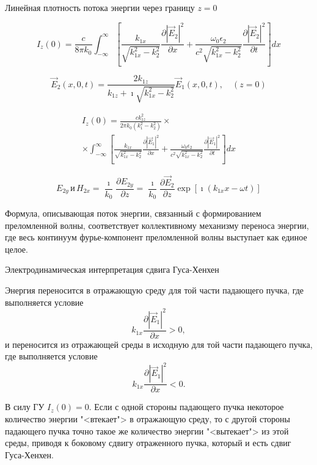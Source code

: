 \documentclass[9pt, compress, xcolor=table]{beamer}
\begin{document}
\begin{frame}{Линейная плотность потока энергии через границу $z=0$}

\begin{equation*}
I_z(0) = \frac{c}{8\pi k_0} \int_{-\infty}^{\infty} \left[ \frac{k_{1x}}{\sqrt{k_{1x}^2-k_2^2}} \frac{\partial |{\vec E}_2|^2}{\partial x} + \frac{\omega_0 \epsilon_2}{c^2 \sqrt{k_{1x}^2-k_2^2}} \frac{\partial |{\vec E}_2|^2}{\partial t}  \right] dx
\end{equation*}

\begin{equation*}
{\vec E}_2(x,0,t) = \frac{2k_{1z}}{k_{1z} + \imath \sqrt{k_{1x}^2-k_2^2}} {\vec E}_1(x,0,t), \quad (z=0)
\end{equation*}


\begin{multline}
I_z(0) = \frac{c k_{1z}^2}{2 \pi k_0 (k_1^2-k_2^2)} \times \\
\times \int_{-\infty}^{\infty} \left[ \frac{k_{1x}}{\sqrt{k_{1x}^2-k_2^2}} \frac{\partial |{\vec E}_1|^2}{\partial x} + \frac{\omega_0 \epsilon_2}{c^2 \sqrt{k_{1x}^2-k_2^2}} \frac{\partial |{\vec E}_1|^2}{\partial t} \right] dx
\end{multline}

\begin{equation*}
E_{2y} \, \text{и} \, H_{2x} = \frac{\imath}{k_0} \frac{\partial E_{2y}}{\partial z} = \frac{\imath}{k_0} \frac{\partial \vec E_2}{\partial z} \exp \left[ \imath (k_{1x}x - \omega t) \right]
\end{equation*}

Формула, описывающая поток энергии, связанный с формированием преломленной волны, соответствует коллективному механизму переноса энергии, где весь континуум фурье-компонент преломленной волны выступает как единое целое.

\end{frame}

\begin{frame}{Электродинамическая интерпретация сдвига Гуса-Хенхен}

Энергия переносится в отражающую среду для той части падающего пучка, где выполняется условие 
\[ 
k_{1x} \frac{\partial |\vec E_1|^2}{\partial x} > 0,
\]
и переносится из отражающей среды в исходную для той части падающего пучка, где выполняется условие  
\[ 
k_{1x} \frac{\partial |\vec E_1|^2}{\partial x} < 0.
\]

В силу ГУ $I_z(0) = 0$. Если с одной стороны падающего пучка некоторое количество энергии "<втекает"> в отражающую среду, то с другой стороны падающего пучка точно такое же количество энергии "<вытекает"> из этой среды, приводя к боковому сдвигу отраженного пучка, который и есть сдвиг Гуса-Хенхен.

\end{frame}
\end{document}
